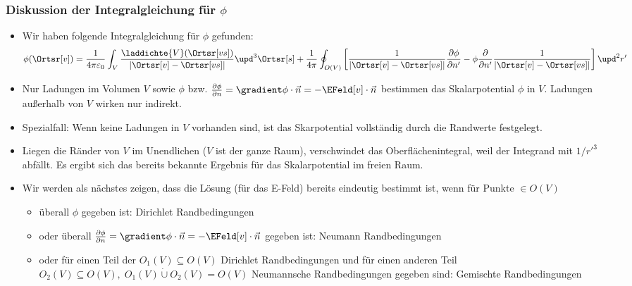    \begin{frame}
     \frametitle{Diskussion der Integralgleichung für $\phi$}
     \begin{itemize}[<+->]
     \item Wir haben folgende Integralgleichung für $\phi$ gefunden:
       $$
      \phi(\Ortsr[v]) = \frac{1}{4\pi\varepsilon_0} \int_V
   \frac{\laddichte{V}(\Ortsr[vs])}{|\Ortsr[v]-\Ortsr[vs]|}
   \upd^3\Ortsr[s] + \frac{1}{4\pi} \oint_{O(V)} \left[\frac{1}{|\Ortsr[v] - \Ortsr[vs]|}\frac{\partial\phi}{\partial n'} - \phi\frac{\partial}{\partial n'}\frac{1}{|\Ortsr[v] - \Ortsr[vs]|} \right] \upd^2r'
       $$
       \item Nur Ladungen \alert{im} Volumen $V$ sowie $\phi$
         bzw. $\frac{\partial\phi}{\partial n}=\gradient\phi\cdot
         \vec{n}=-\EFeld[v]\cdot\vec{n}$ bestimmen das Skalarpotential
         $\phi$ in $V$. Ladungen außerhalb von $V$ wirken nur indirekt.
         \item Spezialfall: Wenn keine Ladungen in $V$ vorhanden sind,
           ist das Skarpotential vollständig durch die Randwerte
           festgelegt.
           \item Liegen die Ränder von $V$ im Unendlichen ($V$ ist der
             ganze Raum), verschwindet das Oberflächenintegral, weil
             der Integrand mit $1/r'^3$ abfällt. Es ergibt sich das
             bereits bekannte Ergebnis für das Skalarpotential im
             freien Raum.
             \item Wir werden als nächstes zeigen, dass die Lösung
               (für das E-Feld) bereits eindeutig bestimmt ist, wenn
               für Punkte $\in O(V)$
               \begin{itemize}
                 \item überall $\phi$ gegeben ist: \alert{Dirichlet
                     Randbedingungen}
                   \item oder überall $\frac{\partial\phi}{\partial n}=\gradient\phi\cdot
         \vec{n}=-\EFeld[v]\cdot\vec{n}$ gegeben ist: \alert{Neumann
           Randbedingungen}
         \item oder für einen Teil der $O_1(V)\subseteq O(V)$ Dirichlet
           Randbedingungen und für einen anderen Teil $O_2(V)\subseteq
           O(V),\; O_1(V) \mathbin{\dot{\cup}} O_2(V) = O(V)$ Neumannsche Randbedingungen gegeben sind:
           \alert{Gemischte Randbedingungen}   
                 \end{itemize}
         \end{itemize}

       \end{frame}

